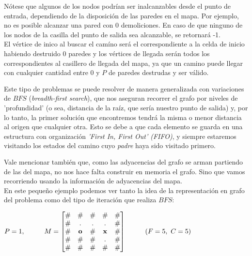 Nótese que algunos de los nodos podrían ser inalcanzables desde el punto de entrada, dependiendo de la disposición de las paredes en el mapa. Por ejemplo, no es posible alcanzar una pared con 0 demoliciones. En caso de que ninguno de los nodos de la casilla del punto de salida sea alcanzable, se retornará -1.
\\

El vértice  de inico al buscar el camíno será el correspondiente a la celda de inicio habiendo destruido 0 paredes y los vértices de llegada serán todos los correspondientes al casillero de llegada del mapa, ya que un camino puede llegar con cualquier cantidad entre 0 y $P$ de paredes destrudas y ser válido.

Este tipo de problemas se puede resolver de manera generalizada con variaciones de $BFS$ (\emph{breadth-first search}), que nos aseguran recorrer el grafo por niveles de 'profundidad' (o sea, distancia de la raíz, que sería nuestro punto de salida) y, por lo tanto, la primer solución que encontremos tendrá la misma o menor distancia al origen que cualquier otra. Esto se debe a que cada elemento se guarda en una estructura con organización \emph{'First In, First Out' (FIFO)}, y siempre estaremos visitando los estados del camino cuyo \emph{padre} haya sido visitado primero.

Vale mencionar también que, como las adyacencias del grafo se arman partiendo de las del mapa, no nos hace falta construir en memoria el grafo. Sino que vamos recorriendo usando la información de adyacencias del mapa.
\\

En este pequeño ejemplo podemos ver tanto la idea de la representación en grafo del problema como del tipo de iteración que realiza $BFS$:

    \begin{center}
        $P=1, \kern 1cm
        M =
        \begin{bmatrix}
            \# & \# & \# & \# & \# \\
            \# & . & . & . & \# \\
            \# & \mathbf{o} & \# & \mathbf{x} & \# \\
            \# & \# & \# & . & \# \\
            \# & \# & \# & \# & \#
        \end{bmatrix}
        \kern 1cm
        (F = 5,\ C = 5)
        $

    \end{center}


